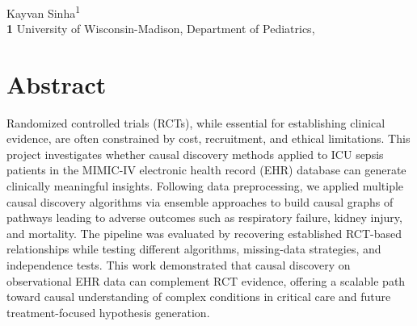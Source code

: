 \documentclass[
  10pt,
  letterpaper,
]{article}
\begin{document}
\vspace*{0.2in}

\begin{flushleft}
{\Large
\textbf{} %
}
\newline
\\
Kayvan Sinha\textsuperscript{1}
\\
\bigskip
\textbf{1} University of Wisconsin-Madison, Department of Pediatrics, 
\bigskip

% 
%






\end{flushleft}

\section*{Abstract}
Randomized controlled trials (RCTs), while essential for establishing
clinical evidence, are often constrained by cost, recruitment, and
ethical limitations. This project investigates whether causal discovery
methods applied to ICU sepsis patients in the MIMIC-IV electronic health
record (EHR) database can generate clinically meaningful insights.
Following data preprocessing, we applied multiple causal discovery
algorithms via ensemble approaches to build causal graphs of pathways
leading to adverse outcomes such as respiratory failure, kidney injury,
and mortality. The pipeline was evaluated by recovering established
RCT-based relationships while testing different algorithms, missing-data
strategies, and independence tests. This work demonstrated that causal
discovery on observational EHR data can complement RCT evidence,
offering a scalable path toward causal understanding of complex
conditions in critical care and future treatment-focused hypothesis
generation.
\end{document}
